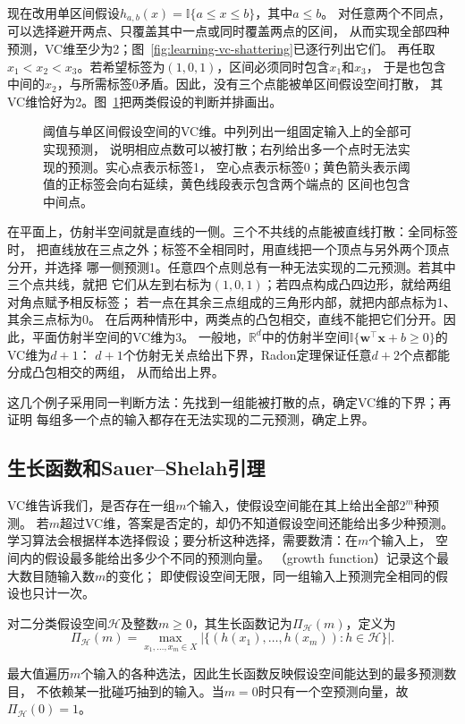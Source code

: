 现在改用单区间假设$h_{a,b}(x)=\mathbb I\{a\leq x\leq b\}$，其中$a\leq b$。
对任意两个不同点，可以选择避开两点、只覆盖其中一点或同时覆盖两点的区间，
从而实现全部四种预测，VC维至少为2；图~\ref{fig:learning-vc-shattering}已逐行列出它们。
再任取$x_1<x_2<x_3$。若希望标签为$(1,0,1)$，区间必须同时包含$x_1$和$x_3$，
于是也包含中间的$x_2$，与所需标签0矛盾。因此，没有三个点能被单区间假设空间打散，
其VC维恰好为2。图~\ref{fig:learning-vc-dimension-examples}把两类假设的判断并排画出。

\begin{figure}[htbp]
  \centering
  
  \caption{阈值与单区间假设空间的VC维。中列列出一组固定输入上的全部可实现预测，
  说明相应点数可以被打散；右列给出多一个点时无法实现的预测。实心点表示标签1，
  空心点表示标签0；黄色箭头表示阈值的正标签会向右延续，黄色线段表示包含两个端点的
  区间也包含中间点。}
  \label{fig:learning-vc-dimension-examples}
\end{figure}
\FloatBarrier

在平面上，仿射半空间就是直线的一侧。三个不共线的点能被直线打散：全同标签时，
把直线放在三点之外；标签不全相同时，用直线把一个顶点与另外两个顶点分开，并选择
哪一侧预测1。任意四个点则总有一种无法实现的二元预测。若其中三个点共线，就把
它们从左到右标为$(1,0,1)$；若四点构成凸四边形，就给两组对角点赋予相反标签；
若一点在其余三点组成的三角形内部，就把内部点标为1、其余三点标为0。
在后两种情形中，两类点的凸包相交，直线不能把它们分开。因此，平面仿射半空间的VC维为3。
一般地，$\mathbb R^d$中的仿射半空间$\mathbb I\{\bm{w}^\top\bm{x}+b\geq0\}$的VC维为$d+1$：
$d+1$个仿射无关点给出下界，Radon定理保证任意$d+2$个点都能分成凸包相交的两组，
从而给出上界。

这几个例子采用同一判断方法：先找到一组能被打散的点，确定VC维的下界；再证明
每组多一个点的输入都存在无法实现的二元预测，确定上界。

\subsection{生长函数和Sauer--Shelah引理}
\label{sec:binary-growth-sauer}

VC维告诉我们，是否存在一组$m$个输入，使假设空间能在其上给出全部$2^m$种预测。
若$m$超过VC维，答案是否定的，却仍不知道假设空间还能给出多少种预测。
学习算法会根据样本选择假设；要分析这种选择，需要数清：在$m$个输入上，
空间内的假设最多能给出多少个不同的预测向量。
（growth function）记录这个最大数目随输入数$m$的变化；
即使假设空间无限，同一组输入上预测完全相同的假设也只计一次。
\begin{definition}[生长函数]
\label{def:growth-function}
对二分类假设空间$\mathcal H$及整数$m\geq0$，其生长函数记为$\Pi_{\mathcal H}(m)$，定义为
\begin{equation}
 \Pi_{\mathcal H}(m)
 =\max_{x_1,\ldots,x_m\in X}
   \left|\{(h(x_1),\ldots,h(x_m)):h\in\mathcal H\}\right|.
 \label{eq:growth-function}
\end{equation}
\end{definition}
最大值遍历$m$个输入的各种选法，因此生长函数反映假设空间能达到的最多预测数目，
不依赖某一批碰巧抽到的输入。当$m=0$时只有一个空预测向量，故$\Pi_{\mathcal H}(0)=1$。

